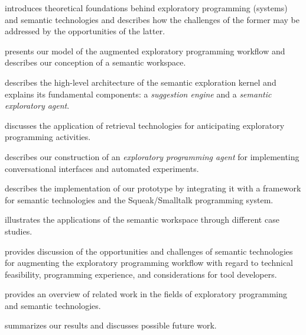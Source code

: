 \begin{description}[noextralabelsep]
	\item[\cref{cha:background}] introduces theoretical foundations behind exploratory programming (systems) and semantic technologies and describes how the challenges of the former may be addressed by the opportunities of the latter.
	\item[\cref{cha:approach}] presents our model of the augmented exploratory programming workflow and describes our conception of a semantic workspace.
	\item[\cref{cha:design}] describes the high-level architecture of the semantic exploration kernel and explains its fundamental components: a \emph{suggestion engine} and a \emph{semantic exploratory agent}.
	\item[\cref{cha:retrieval}] discusses the application of retrieval technologies for anticipating exploratory programming activities.
	\item[\cref{cha:agent}] describes our construction of an \emph{exploratory programming agent} for implementing conversational interfaces and automated experiments.
	\item[\cref{cha:implementation}] describes the implementation of our prototype by integrating it with a framework for semantic technologies and the Squeak/Smalltalk programming system.
	\item[\cref{cha:application}] illustrates the applications of the semantic workspace through different case studies.
	\item[\cref{cha:discussion}] provides discussion of the opportunities and challenges of semantic technologies for augmenting the exploratory programming workflow with regard to technical feasibility, programming experience, and considerations for tool developers.
	\item[\cref{cha:related_work}] provides an overview of related work in the fields of exploratory programming and semantic technologies.
	\item[\cref{cha:conclusion}] summarizes our results and discusses possible future work.
\end{description}

